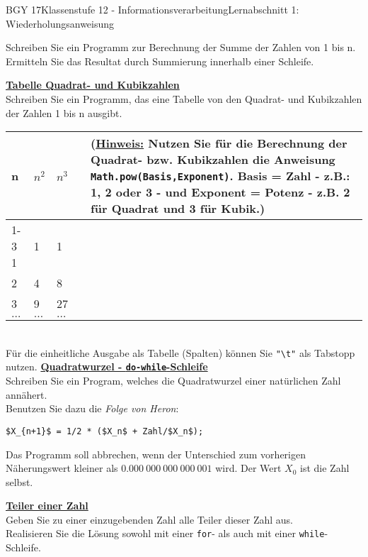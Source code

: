 \documentclass[oneside,openany,headings=optiontotoc,11pt,numbers=noenddot]{scrreprt}
\begin{document}
\begin{worksheet}{BGY 17}{Klassenstufe 12 - Informationsverarbeitung}{Lernabschnitt 1: Wiederholungsanweisung}
\begin{framed}
			Schreiben Sie ein Programm zur Berechnung der Summe der Zahlen von 1 bis n.\\
			Ermitteln Sie das Resultat durch Summierung innerhalb einer Schleife.\\
			\par\bigskip\noindent
			\textbf{\underline{Tabelle Quadrat- und Kubikzahlen}}\\
			Schreiben Sie ein Programm, das eine Tabelle von den Quadrat- und Kubikzahlen der Zahlen 1 bis n ausgibt.
			\par\noindent
			\begin{tabularx}{\textwidth}{llllX}
				n & \(n^2\) & \(n^3\) & &  \multirow{5}{0.75\textwidth}{(\underline{Hinweis:} Nutzen Sie für die Berechnung der Quadrat- bzw. Kubikzahlen die Anweisung \lstinline[style=JavaInputStyle]{Math.pow(Basis,Exponent)}. Basis = Zahl - z.B.: 1, 2 oder 3 - und Exponent = Potenz - z.B. 2 für Quadrat und 3 für Kubik.)}\\
				\cline{1-3}
				1 & 1 & 1 & &\\
				2 & 4 & 8 & &\\
				3 & 9 & 27& &\\
				\(\ldots\) & \(\ldots\) & \(\ldots\) & &
			\end{tabularx}\\
			Für die einheitliche Ausgabe als Tabelle (Spalten) können Sie \lstinline[style=JavaInputStyle]{"\t"} als Tabstopp nutzen.
			\newpage\noindent
			\textbf{\underline{Quadratwurzel - \lstinline[style=JavaInputStyle]{do-while}-Schleife}}\\
			Schreiben Sie ein Program, welches die Quadratwurzel einer natürlichen Zahl annähert.\\
			Benutzen Sie dazu die \textit{Folge von Heron}:
			\begin{lstlisting}[style=JavaInputStyle,mathescape=true]
				$X_{n+1}$ = 1/2 * ($X_n$ + Zahl/$X_n$);
			\end{lstlisting}
			Das Programm soll abbrechen, wenn der Unterschied zum vorherigen Näherungswert kleiner als \(0.000\ 000\ 000\ 000\ 001\) wird. Der Wert \(X_0\) ist die Zahl selbst.\\
			\par\bigskip\noindent
			\textbf{\underline{Teiler einer Zahl}}\\
			Geben Sie zu einer einzugebenden Zahl alle Teiler dieser Zahl aus.\\Realisieren Sie die Lösung sowohl mit einer \lstinline[style=JavaInputStyle]{for}- als auch mit einer \lstinline[style=JavaInputStyle]{while}-Schleife.
		\end{framed}
	\end{worksheet}
\end{document}

